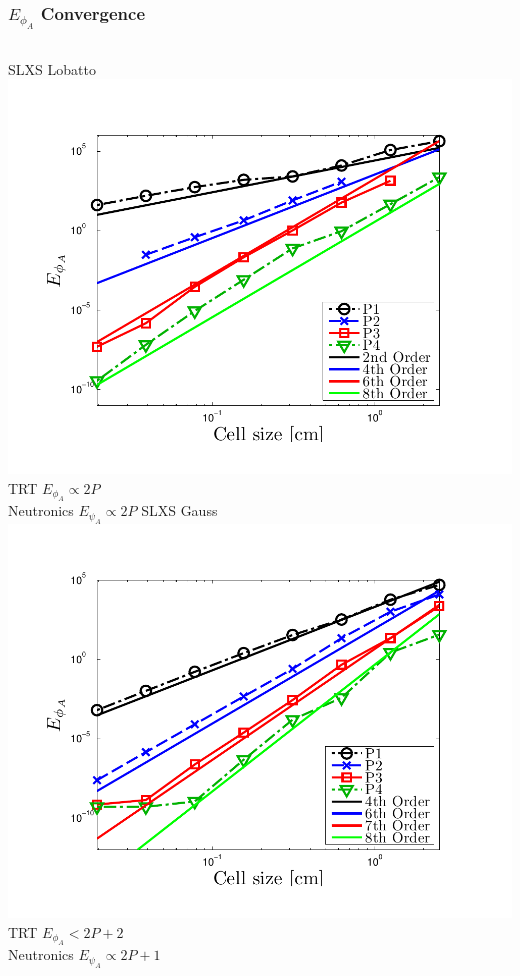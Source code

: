 \documentclass{beamer}
\begin{document}
\begin{frame}
\frametitle{$E_{\phi_A}$ Convergence}
\begin{columns}[t]
\centering
SLXS Lobatto
\includegraphics[width=\textwidth,trim=0.25in  0.2in 0.75in 0.5in,clip=true]{../chapter6_grey_radtran/Dissertation_Data/Constant_Time_SLXS_Lobatto_phi_A.pdf}
\\
TRT $E_{\phi_A}\propto 2P$
\\
Neutronics $E_{\psi_A} \propto 2P$
\centering
SLXS Gauss
\includegraphics[width=\textwidth,trim=0.25in  0.2in 0.75in 0.5in,clip=true]{../chapter6_grey_radtran/Dissertation_Data/Constant_Time_SLXS_Gauss_phi_A.pdf}
\\ 
TRT $E_{\phi_A} < 2P+2 $
\\
Neutronics $E_{\psi_A} \propto 2P+1$
\end{columns}
\centering
\end{frame}
\end{document}
